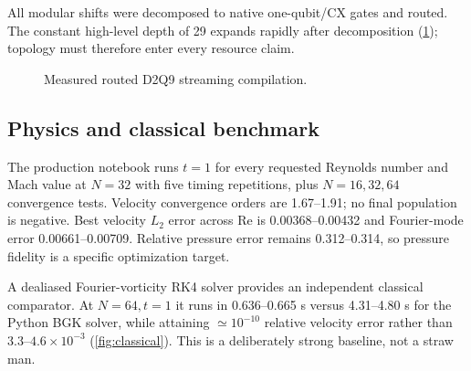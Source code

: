\documentclass[10pt,twocolumn]{article}
\newcommand{\Rey}{\mathrm{Re}}
\begin{document}
All modular shifts were decomposed to native one-qubit/CX gates and routed.
The constant high-level depth of 29 expands rapidly after decomposition
(\cref{fig:streaming}); topology must therefore enter every resource claim.

\begin{figure}[t]
\centering
{}
\caption{Measured routed D2Q9 streaming compilation.}
\label{fig:streaming}
\end{figure}

\subsection{Physics and classical benchmark}
The production notebook runs $t=1$ for every requested Reynolds number and
Mach value at $N=32$ with five timing repetitions, plus $N=16,32,64$
convergence tests. Velocity convergence orders are 1.67--1.91; no final
population is negative. Best velocity $L_2$ error across $\Rey$ is
0.00368--0.00432 and Fourier-mode error 0.00661--0.00709. Relative pressure
error remains 0.312--0.314, so pressure fidelity is a specific optimization
target.

A dealiased Fourier-vorticity RK4 solver provides an independent classical
comparator. At $N=64,t=1$ it runs in 0.636--0.665 s versus 4.31--4.80 s for
the Python BGK solver, while attaining $\simeq10^{-10}$ relative velocity
error rather than $3.3$--$4.6\times10^{-3}$ (\cref{fig:classical}). This is a
deliberately strong baseline, not a straw man.
\end{document}
